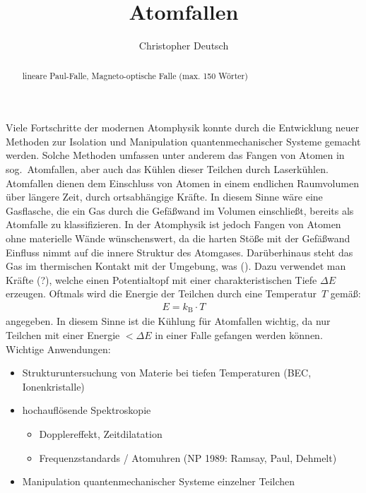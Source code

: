 \documentclass[twocolumn]{revtex4}
\begin{document}
\title{Atomfallen}

\author{Christopher Deutsch}




\begin{abstract}
%
lineare Paul-Falle, Magneto-optische Falle (max. 150 Wörter)
%
\end{abstract}

\maketitle

Viele Fortschritte der modernen Atomphysik konnte durch die Entwicklung neuer Methoden zur Isolation und Manipulation quantenmechanischer Systeme gemacht werden.
Solche Methoden umfassen unter anderem das Fangen von Atomen in sog.~Atomfallen, aber auch das Kühlen dieser Teilchen durch Laserkühlen.
Atomfallen dienen dem Einschluss von Atomen in einem endlichen Raumvolumen über längere Zeit, durch ortsabhängige Kräfte.
In diesem Sinne wäre eine Gasflasche, die ein Gas durch die Gefäßwand im Volumen einschließt, bereits als Atomfalle zu klassifizieren.
In der Atomphysik ist jedoch Fangen von Atomen ohne materielle Wände wünschenswert, da die harten Stöße mit der Gefäßwand Einfluss nimmt auf die innere Struktur des Atomgases.
Darüberhinaus steht das Gas im thermischen Kontakt mit der Umgebung, was ().
Dazu verwendet man Kräfte (?), welche einen Potentialtopf mit einer charakteristischen Tiefe $\Delta E$ erzeugen.
Oftmals wird die Energie der Teilchen durch eine Temperatur~$T$ gemäß:
\begin{align}
	E = k_\mathrm{B} \cdot T
\end{align}
angegeben.
In diesem Sinne ist die Kühlung für Atomfallen wichtig, da nur Teilchen mit einer Energie $< \Delta E$ in einer Falle gefangen werden können.
Wichtige Anwendungen:
\begin{itemize}
	\item Strukturuntersuchung von Materie bei tiefen Temperaturen (BEC, Ionenkristalle)
	\item hochauflösende Spektroskopie
	\begin{itemize}
		\item Dopplereffekt, Zeitdilatation
		\item Frequenzstandards / Atomuhren (NP 1989: Ramsay, Paul, Dehmelt)
	\end{itemize}
	\item Manipulation quantenmechanischer Systeme einzelner Teilchen
\end{itemize}
\end{document}
